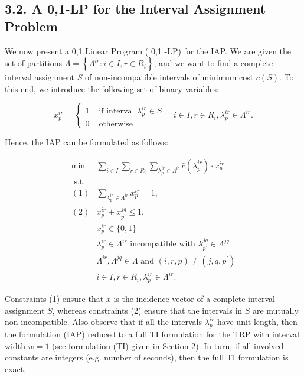 \documentclass[10pt]{article}
\begin{document}
\subsection*{3.2. A 0,1-LP for the Interval Assignment Problem}
We now present a 0,1 Linear Program ( 0,1 -LP) for the IAP. We are given the set of partitions $\Lambda=\left\{\Lambda^{i r}: i \in I, r \in R_{i}\right\}$, and we want to find a complete interval assignment $S$ of non-incompatible intervals of minimum cost $\bar{c}(S)$. To this end, we introduce the following set of binary variables:

$$
x_{p}^{i r}=\left\{\begin{array}{ll}
1 & \text { if interval } \lambda_{p}^{i r} \in S \\
0 & \text { otherwise }
\end{array} \quad i \in I, r \in R_{i}, \lambda_{p}^{i r} \in \Lambda^{i r} .\right.
$$

Hence, the IAP can be formulated as follows:

\[
\begin{array}{ll}
\min & \sum_{i \in I} \sum_{r \in R_{i}} \sum_{\lambda_{p}^{i r} \in \Lambda^{i r}} \bar{c}\left(\lambda_{p}^{i r}\right) \cdot x_{p}^{i r} \\
\text { s.t. } & \\
(1) & \sum_{\lambda_{p}^{i r} \in \Lambda^{i r}} x_{p}^{i r}=1, \\
(2) & x_{p}^{i r}+x_{p^{\prime}}^{j q} \leq 1, \\
& x_{p}^{i r} \in\{0,1\} \\
& \lambda_{p}^{i r} \in \Lambda^{i r} \text { incompatible with } \lambda_{p^{\prime}}^{j q} \in \Lambda^{j q}  \tag{IAP}\\
& \Lambda^{i r}, \Lambda^{j q} \in \Lambda \text { and }(i, r, p) \neq\left(j, q, p^{\prime}\right) \\
& i \in I, r \in R_{i}, \lambda_{p}^{i r} \in \Lambda^{i r} .
\end{array}
\]

Constraints (1) ensure that $x$ is the incidence vector of a complete interval assignment $S$, whereas constraints (2) ensure that the intervals in $S$ are mutually non-incompatible. Also observe that if all the intervals $\lambda_{p}^{i r}$ have unit length, then the formulation (IAP) reduced to a full TI formulation for the TRP with interval width $w=1$ (see formulation (TI) given in Section 2). In turn, if all involved constants are integers (e.g. number of seconds), then the full TI formulation is exact.
\end{document}
